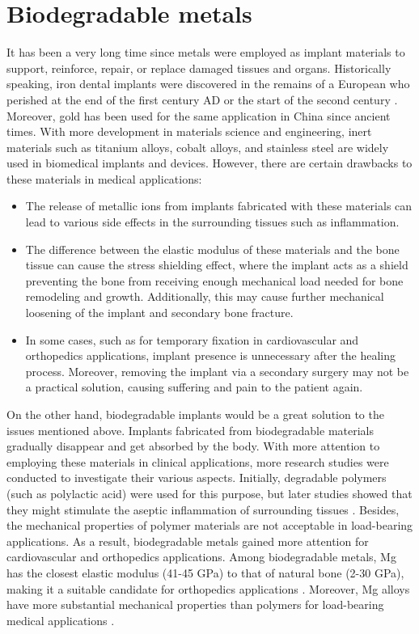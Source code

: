 \section{Biodegradable metals}

It has been a very long time since metals were employed as implant materials to support, reinforce, repair, or replace damaged tissues and organs. Historically speaking, iron dental implants were discovered in the remains of a European who perished at the end of the first century AD or the start of the second century \cite{Crubzy1998}. Moreover, gold has been used for the same application in China since ancient times. With more development in materials science and engineering, inert materials such as titanium alloys, cobalt alloys, and stainless steel are widely used in biomedical implants and devices. However, there are certain drawbacks to these materials in medical applications:

\begin{itemize}
\item
The release of metallic ions from implants fabricated with these materials can lead to various side effects in the surrounding tissues such as inflammation.
\item
The difference between the elastic modulus of these materials and the bone tissue can cause the stress shielding effect, where the implant acts as a shield preventing the bone from receiving enough mechanical load needed for bone remodeling and growth. Additionally, this may cause further mechanical loosening of the implant and secondary bone fracture.
\item
In some cases, such as for temporary fixation in cardiovascular and orthopedics applications, implant presence is unnecessary after the healing process. Moreover, removing the implant via a secondary surgery may not be a practical solution, causing suffering and pain to the patient again.
\end{itemize}

On the other hand, biodegradable implants would be a great solution to the issues mentioned above. Implants fabricated from biodegradable materials gradually disappear and get absorbed by the body. With more attention to employing these materials in clinical applications, more research studies were conducted to investigate their various aspects. Initially, degradable polymers (such as polylactic acid) were used for this purpose, but later studies showed that they might stimulate the aseptic inflammation of surrounding tissues \cite{Gao2022}. Besides, the mechanical properties of polymer materials are not acceptable in load-bearing applications. As a result, biodegradable metals gained more attention for cardiovascular and orthopedics applications. Among biodegradable metals, Mg has the closest elastic modulus (41-45 GPa) to that of natural bone (2-30 GPa), making it a suitable candidate for orthopedics applications \cite{Wang2020a}. Moreover, Mg alloys have more substantial mechanical properties than polymers for load-bearing medical applications \cite{Han2019}.


